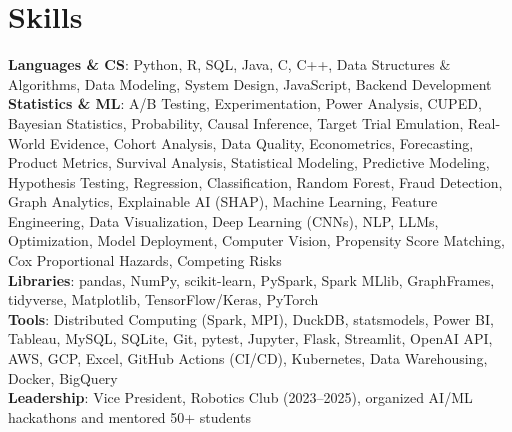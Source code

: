 \documentclass[letterpaper,11pt]{article}
\begin{document}
\section{Skills}
 \begin{itemize}[leftmargin=0.15in, label={}]
    \small{\item{
     \textbf{Languages \& CS}{: Python, R, SQL, Java, C, C++, Data Structures \& Algorithms, Data Modeling, System Design, JavaScript, Backend Development} \\
     \textbf{Statistics \& ML}{: A/B Testing, Experimentation, Power Analysis, CUPED, Bayesian Statistics, Probability, Causal Inference, Target Trial Emulation, Real-World Evidence, Cohort Analysis, Data Quality, Econometrics, Forecasting, Product Metrics, Survival Analysis, Statistical Modeling, Predictive Modeling, Hypothesis Testing, Regression, Classification, Random Forest, Fraud Detection, Graph Analytics, Explainable AI (SHAP), Machine Learning, Feature Engineering, Data Visualization, Deep Learning (CNNs), NLP, LLMs, Optimization, Model Deployment, Computer Vision, Propensity Score Matching, Cox Proportional Hazards, Competing Risks} \\
     \textbf{Libraries}{: pandas, NumPy, scikit-learn, PySpark, Spark MLlib, GraphFrames, tidyverse, Matplotlib, TensorFlow/Keras, PyTorch} \\
     \textbf{Tools}{: Distributed Computing (Spark, MPI), DuckDB, statsmodels, Power BI, Tableau, MySQL, SQLite, Git, pytest, Jupyter, Flask, Streamlit, OpenAI API, AWS, GCP, Excel, GitHub Actions (CI/CD), Kubernetes, Data Warehousing, Docker, BigQuery} \\
     \textbf{Leadership}{: Vice President, Robotics Club (2023--2025), organized AI/ML hackathons and mentored 50+ students}
    }}
 \end{itemize}
\end{document}
